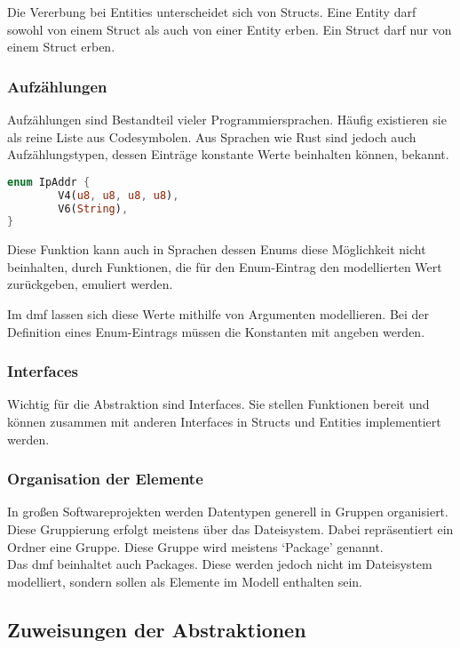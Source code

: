 \documentclass[./einleitung.tex]{subfiles}
\begin{document}
    Die Vererbung bei Entities unterscheidet sich von Structs.
    Eine Entity darf sowohl von einem Struct als auch von einer Entity erben.
    Ein Struct darf nur von einem Struct erben.

    \subsubsection{Aufzählungen}
    Aufzählungen sind Bestandteil vieler Programmiersprachen.
    Häufig existieren sie als reine Liste aus Codesymbolen.
    Aus Sprachen wie Rust sind jedoch auch Aufzählungstypen, dessen Einträge konstante Werte beinhalten können, bekannt.
    \begin{lstlisting}[language=Rust, caption=Ein Enum in Rust von \cite{rustcookbook}]
enum IpAddr {
        V4(u8, u8, u8, u8),
        V6(String),
}
    \end{lstlisting}

    Diese Funktion kann auch in Sprachen dessen Enums diese Möglichkeit nicht beinhalten, durch Funktionen, die für den Enum-Eintrag den modellierten Wert zurückgeben, emuliert werden.

    Im \acrshort{dmf} lassen sich diese Werte mithilfe von Argumenten modellieren.
    Bei der Definition eines Enum-Eintrags müssen die Konstanten mit angeben werden.

    \subsubsection{Interfaces}
    Wichtig für die Abstraktion sind Interfaces.
    Sie stellen Funktionen bereit und können zusammen mit anderen Interfaces in Structs und Entities implementiert werden.

    \subsubsection{Organisation der Elemente}
    In großen Softwareprojekten werden Datentypen generell in Gruppen organisiert.
    Diese Gruppierung erfolgt meistens über das Dateisystem.
    Dabei repräsentiert ein Ordner eine Gruppe.
    Diese Gruppe wird meistens `Package' genannt. \\
    Das \acrshort{dmf} beinhaltet auch Packages.
    Diese werden jedoch nicht im Dateisystem modelliert, sondern sollen als Elemente im Modell enthalten sein.

    \subsection{Zuweisungen der Abstraktionen}
\end{document}
